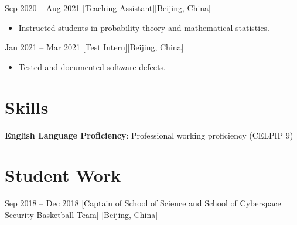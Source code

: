 \documentclass{chicv}
\begin{document}
  {Sep 2020 -- Aug 2021}
  [Teaching Assistant][Beijing, China]
  \begin{itemize}
    \item Instructed students in probability theory and mathematical statistics.
  \end{itemize}

  {Jan 2021 -- Mar 2021}
  [Test Intern][Beijing, China]
  \begin{itemize}
    \item Tested and documented software defects.
  \end{itemize}

\section{Skills}
\begin{compactlist}
  \item \textbf{English Language Proficiency}: Professional working proficiency (CELPIP 9)
\end{compactlist}

\section{Student Work}
  {Sep 2018 -- Dec 2018}
  [Captain of School of Science and School of Cyberspace Security Basketball Team]
  [Beijing, China]
\end{document}
